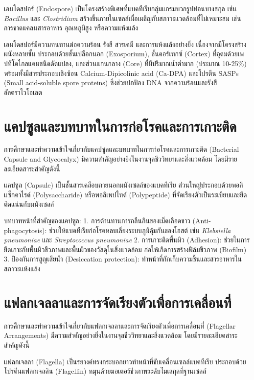เอนโดสปอร์ (Endospore) เป็นโครงสร้างพิเศษที่แบคทีเรียกลุ่มแกรมบวกรูปท่อนบางสกุล เช่น \textit{Bacillus} และ \textit{Clostridium} สร้างขึ้นภายในเซลล์เมื่อเผชิญกับสภาวะแวดล้อมที่ไม่เหมาะสม เช่น การขาดแคลนสารอาหาร อุณหภูมิสูง หรือความแห้งแล้ง

เอนโดสปอร์มีความทนทานต่อความร้อน รังสี สารเคมี และการแห้งแล้งอย่างยิ่ง เนื่องจากมีโครงสร้างผนังหลายชั้น ประกอบด้วยชั้นเปลือกนอก (Exosporium), ชั้นคอร์เทกซ์ (Cortex) ที่อุดมด้วยเพปทิโดไกลแคนชนิดดัดแปลง, และส่วนแกนกลาง (Core) ที่มีปริมาณน้ำต่ำมาก (ประมาณ 10-25\%) พร้อมทั้งมีสารประกอบเชิงซ้อน Calcium-Dipicolinic acid (Ca-DPA) และโปรตีน SASPs (Small acid-soluble spore proteins) ซึ่งช่วยปกป้อง DNA จากความร้อนและรังสีอัลตราไวโอเลต

\section{แคปซูลและบทบาทในการก่อโรคและการเกาะติด}

การศึกษาและทำความเข้าใจเกี่ยวกับแคปซูลและบทบาทในการก่อโรคและการเกาะติด (Bacterial Capsule and Glycocalyx) มีความสำคัญอย่างยิ่งในงานจุลชีววิทยาและสิ่งแวดล้อม โดยมีรายละเอียดสาระสำคัญดังนี้

แคปซูล (Capsule) เป็นชั้นสารเคลือบภายนอกผนังเซลล์ของแบคทีเรีย ส่วนใหญ่ประกอบด้วยพอลิแซ็กคาไรด์ (Polysaccharide) หรือพอลิเพปไทด์ (Polypeptide) ที่จัดเรียงตัวเป็นระเบียบและยึดติดแน่นกับผนังเซลล์

บทบาทหน้าที่สำคัญของแคปซูล:
1. การต้านทานการกลืนกินของเม็ดเลือดขาว (Anti-phagocytosis): ช่วยให้แบคทีเรียก่อโรคหลบเลี่ยงระบบภูมิคุ้มกันของโฮสต์ เช่น \textit{Klebsiella pneumoniae} และ \textit{Streptococcus pneumoniae}
2. การเกาะติดพื้นผิว (Adhesion): ช่วยในการยึดเกาะกับพื้นผิวชีวภาพและพื้นผิวของวัสดุในสิ่งแวดล้อม ก่อให้เกิดการสร้างฟิล์มชีวภาพ (Biofilm)
3. ป้องกันการสูญเสียน้ำ (Desiccation protection): ทำหน้าที่กักเก็บความชื้นและสารอาหารในสภาวะแห้งแล้ง

\section{แฟลกเจลลาและการจัดเรียงตัวเพื่อการเคลื่อนที่}

การศึกษาและทำความเข้าใจเกี่ยวกับแฟลกเจลลาและการจัดเรียงตัวเพื่อการเคลื่อนที่ (Flagellar Arrangements) มีความสำคัญอย่างยิ่งในงานจุลชีววิทยาและสิ่งแวดล้อม โดยมีรายละเอียดสาระสำคัญดังนี้

แฟลกเจลลา (Flagella) เป็นรยางค์ทรงกระบอกยาวทำหน้าที่ขับเคลื่อนเซลล์แบคทีเรีย ประกอบด้วยโปรตีนแฟลกเจลลิน (Flagellin) หมุนด้วยมอเตอร์ชีวภาพระดับโมเลกุลที่ฐานเซลล์

